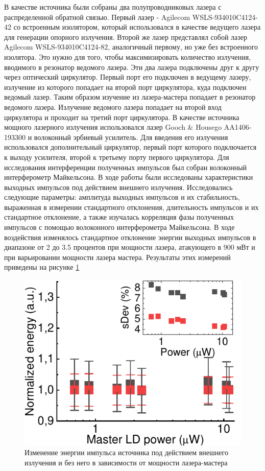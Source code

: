 В качестве источника были собраны два полупроводниковых лазера с распределенной обратной связью. Первый лазер - Agilecom WSLS-934010C4124-42 со встроенным изолятором, который использовался в качестве ведущего лазера для генерации опорного излучения. Второй же лазер представлял собой лазер Agilecom WSLS-934010C4124-82, аналогичный первому, но уже без встроенного изолятора. Это нужно для того, чтобы максимизировать количество излучения, вводимого в резонатор ведомого лазера. Эти два лазера подключены друг к другу через оптический циркулятор. Первый порт его подключен в ведущему лазеру, излучение из которого попадает на второй порт циркулятора, куда подключен ведомый лазер. Таким образом изучение из лазера-мастера попадает в резонатор ведомого лазера. Излучение ведомого лазера попадает на второй вход циркулятора и проходит на третий порт циркулятора. В качестве источника мощного лазерного излучения использовался лазер Gooch \& Housego AA1406-193300 и волоконный эрбиевый усилитель. Для введения его излучения использовался дополнительный циркулятор, первый порт которого подключается к выходу усилителя, второй к третьему порту первого циркулятора. Для исследования интерференции полученных импульсов был собран волоконный интерферометр Майкельсона. 
\newline В ходе работы были исследованы характеристики выходных импульсов под действием внешнего излучения. Исследовались следующие параметры: амплитуда выходных импульсов и их стабильность, выраженная в измерении стандартного отклонения, длительность импульсов и их стандартное отклонение, а также изучалась корреляция фазы полученных импульсов с помощью волоконного интерферометра Майкельсона. В ходе воздействия изменялось стандартное отклонение энергии выходных импульсов в диапазоне от 2 до 3.5 процентов при мощности лазера, атакующего в 900 мВт и при варьировании мощности лазера мастера. Результаты этих измерений приведены на рисунке \ref{fig:area MDI ref}
\begin{figure}
    \centering
    \includegraphics{images/area_under_attack.pdf}
    \caption{Изменение энергии импульса источника под действием внешнего излучения и без него в зависимости от мощности лазера-мастера}
    \label{fig:area MDI ref}
\end{figure}
